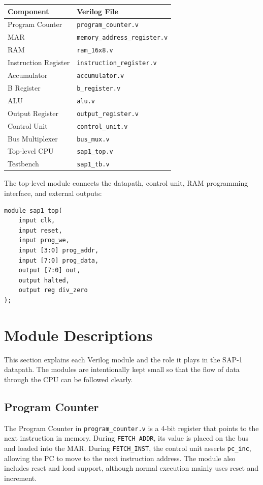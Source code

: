 \documentclass[12pt,a4paper]{article}
\begin{document}
\begin{center}
\begin{tabular}{l l}
\toprule
Component & Verilog File \\
\midrule
Program Counter & \texttt{program\_counter.v} \\
MAR & \texttt{memory\_address\_register.v} \\
RAM & \texttt{ram\_16x8.v} \\
Instruction Register & \texttt{instruction\_register.v} \\
Accumulator & \texttt{accumulator.v} \\
B Register & \texttt{b\_register.v} \\
ALU & \texttt{alu.v} \\
Output Register & \texttt{output\_register.v} \\
Control Unit & \texttt{control\_unit.v} \\
Bus Multiplexer & \texttt{bus\_mux.v} \\
Top-level CPU & \texttt{sap1\_top.v} \\
Testbench & \texttt{sap1\_tb.v} \\
\bottomrule
\end{tabular}
\end{center}

The top-level module connects the datapath, control unit, RAM programming interface, and external outputs:

\begin{lstlisting}[style=verilogstyle,caption={Top-level interface from sap1\_top.v}]
module sap1_top(
    input clk,
    input reset,
    input prog_we,
    input [3:0] prog_addr,
    input [7:0] prog_data,
    output [7:0] out,
    output halted,
    output reg div_zero
);
\end{lstlisting}

\section{Module Descriptions}

This section explains each Verilog module and the role it plays in the SAP-1 datapath. The modules are intentionally kept small so that the flow of data through the CPU can be followed clearly.

\subsection{Program Counter}

The Program Counter in \texttt{program\_counter.v} is a 4-bit register that points to the next instruction in memory. During \texttt{FETCH\_ADDR}, its value is placed on the bus and loaded into the MAR. During \texttt{FETCH\_INST}, the control unit asserts \texttt{pc\_inc}, allowing the PC to move to the next instruction address. The module also includes reset and load support, although normal execution mainly uses reset and increment.
\end{document}
